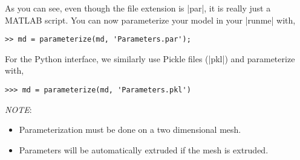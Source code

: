 As you can see, even though the file extension is \lstinlinebg|par|, it is really just a MATLAB script. You can now parameterize your model in your \lstinlinebg|runme| with,
\begin{lstlisting}
>> md = parameterize(md, 'Parameters.par');
\end{lstlisting}

For the Python interface, we similarly use Pickle files (\lstinlinebg|pkl|) and parameterize with,
\begin{lstlisting}
>>> md = parameterize(md, 'Parameters.pkl')
\end{lstlisting}


\emph{NOTE}:
\begin{itemize}
	\item Parameterization must be done on a two dimensional mesh.
	\item Parameters will be automatically extruded if the mesh is extruded.
\end{itemize}

\clearpage %
